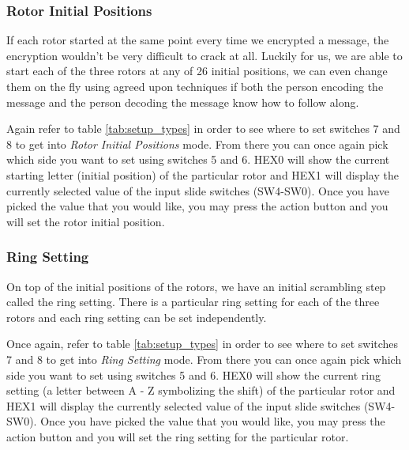 \documentclass{article}
\begin{document}
\subsubsection{Rotor Initial Positions}
If each rotor started at the same point every time we encrypted a message, the encryption wouldn't be very difficult to crack at all. Luckily for us, we are able to start each of the three rotors at any of 26 initial positions, we can even change them on the fly using agreed upon techniques if both the person encoding the message and the person decoding the message know how to follow along. 

Again refer to table \ref{tab:setup_types} in order to see where to set switches 7 and 8 to get into \textit{Rotor Initial Positions} mode. From there you can once again pick which side you want to set using switches 5 and 6. HEX0 will show the current starting letter (initial position) of the particular rotor and HEX1 will display the currently selected value of the input slide switches (SW4-SW0). Once you have picked the value that you would like, you may press the action button and you will set the rotor initial position. 

\subsubsection{Ring Setting}
On top of the initial positions of the rotors, we have an initial scrambling step called the ring setting. There is a particular ring setting for each of the three rotors and each ring setting can be set independently. 

Once again, refer to table \ref{tab:setup_types} in order to see where to set switches 7 and 8 to get into \textit{Ring Setting} mode. From there you can once again pick which side you want to set using switches 5 and 6. HEX0 will show the current ring setting (a letter between A - Z symbolizing the shift) of the particular rotor and HEX1 will display the currently selected value of the input slide switches (SW4-SW0). Once you have picked the value that you would like, you may press the action button and you will set the ring setting for the particular rotor.

\clearpage



\end{document}
